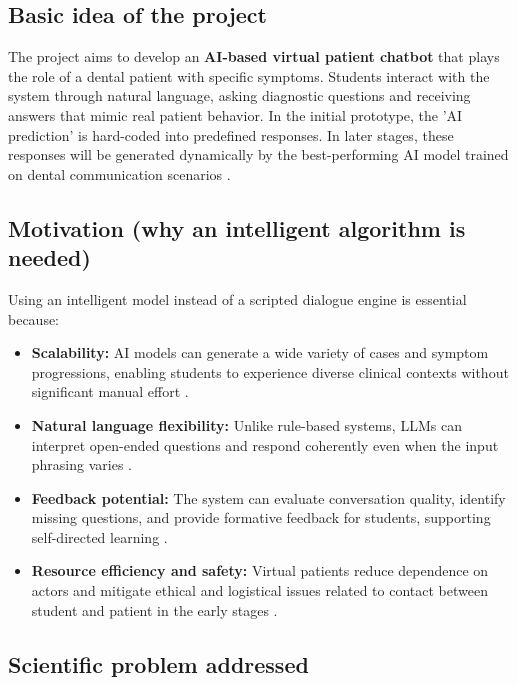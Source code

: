 \documentclass[runningheads,a4paper,11pt]{report}
\begin{document}
\subsection{Basic idea of the project}

The project aims to develop an \textbf{AI-based virtual patient chatbot} that plays the role of a dental patient with specific symptoms. Students interact with the system through natural language, asking diagnostic questions and receiving answers that mimic real patient behavior. In the initial prototype, the 'AI prediction' is hard-coded into predefined responses. In later stages, these responses will be generated dynamically by the best-performing AI model trained on dental communication scenarios \cite{suarez2022, cepdnaclk2022}.

\subsection{Motivation (why an intelligent algorithm is needed)}

Using an intelligent model instead of a scripted dialogue engine is essential because:
\begin{itemize}
  \item \textbf{Scalability:} AI models can generate a wide variety of cases and symptom progressions, enabling students to experience diverse clinical contexts without significant manual effort \cite{jones2025}.
  \item \textbf{Natural language flexibility:} Unlike rule-based systems, LLMs can interpret open-ended questions and respond coherently even when the input phrasing varies \cite{or2024}.
  \item \textbf{Feedback potential:} The system can evaluate conversation quality, identify missing questions, and provide formative feedback for students, supporting self-directed learning \cite{suarez2022, or2024}.
  \item \textbf{Resource efficiency and safety:} Virtual patients reduce dependence on actors and mitigate ethical and logistical issues related to contact between student and patient in the early stages \cite{suarez2022}.
\end{itemize}

\subsection{Scientific problem addressed}
\end{document}
